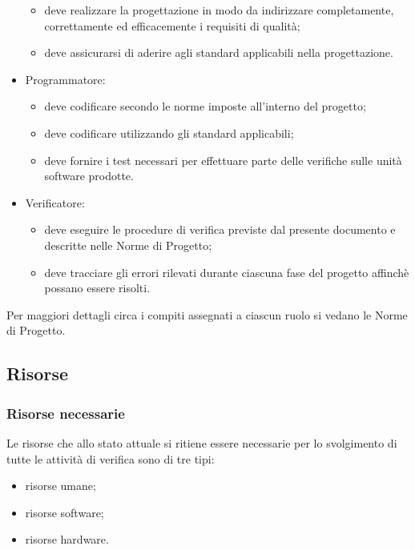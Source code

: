 \begin{itemize}
\begin{itemize}
					\item deve realizzare la progettazione in modo da indirizzare completamente, correttamente ed efficacemente i requisiti di qualità;
					\item deve assicurarsi di aderire agli standard applicabili nella progettazione.
				\end{itemize}
				\item Programmatore:
				\begin{itemize}
					\item deve codificare secondo le norme imposte all'interno del progetto;
					\item deve codificare utilizzando gli standard applicabili;
					\item deve fornire i test necessari per effettuare parte delle verifiche sulle unità software prodotte.
				\end{itemize}
				\item Verificatore:
				\begin{itemize}
					\item deve eseguire le procedure di verifica previste dal presente documento e descritte nelle Norme di Progetto;
					\item deve tracciare gli errori rilevati durante ciascuna fase del progetto affinchè possano essere risolti.
				\end{itemize}
			\end{itemize}
			Per maggiori dettagli circa i compiti assegnati a ciascun ruolo si vedano le Norme di Progetto.
		\subsection{Risorse}
			\subsubsection{Risorse necessarie}
				Le risorse che allo stato attuale si ritiene essere necessarie per lo svolgimento di tutte le attività di verifica 
				sono di tre tipi:
				\begin{itemize}
					\item risorse umane;
					\item risorse software;
					\item risorse hardware.
				\end{itemize}
